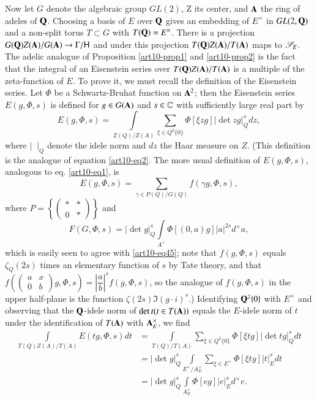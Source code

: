 Now let $G$ denote the algebraic group $GL(2)$, Z its center, and $\mathbf{A}$ the ring of adeles of $\mathbf{Q}$. Choosing a basis of $E$ over $\mathbf{Q}$ gives an embedding of $E^\times$ in $GL (2, \mathbf{Q})$ and a non-split torus $T \subset G$ with $T (\mathbf{Q}) = E^{\times}$. There is a projection $G (\mathbf{Q}) Z(\mathbf{A})/ G (\mathbf{A}) \to \Gamma / \mathsf{H}$ and under this projection $T (\mathbf{Q}) Z (\mathbf{A}) / T (\mathbf{A})$ maps to $\mathscr{S}_E$. The adelic analogue of Proposition \ref{art10-prop1} and \ref{art10-prop2} is the fact that the integral of an Eisenstein series over $T (\mathbf{Q})Z (\mathbf{A}) / T (\mathbf{A})$ is a multiple of the zeta-function of $E$. To prove it, we must recall the definition of the Eisenstein series. Let $\Phi$ be a Schwartz-Bruhat function on $\mathbf{A}^2$; then the Eisenstein series $E (g, \Phi, s)$ is defined for $g \in G(\mathbf{A})$ and $s \in \mathbb{C}$ with sufficiently large real part by 
\begin{equation*}
E (g , \Phi, s) = \int\limits_{Z (Q) / Z (A)} \sum\limits_{\xi \in Q^2 \{0\}} \Phi [\xi z g] |\det z g|^s_Q dz, \tag{45} \label{art10-eq45}
\end{equation*}
where $|{\;\;}|_Q$ denote the idele norm and $dz$ the Haar measure on $Z$. (This definition is the analogue of equation \eqref{art10-eq2}. The more usual definition of $E(g, \Phi, s)$, analogous to eq. \eqref{art10-eq1}, is
$$
E (g, \Phi , s) = \sum\limits_{ \gamma \in P (Q) / G (Q)} f (\gamma g, \Phi , s),
$$
where $P = \left\{\left(\begin{matrix}\ast & \ast \\ 0 & \ast \end{matrix}\right)\right\}$ and 
$$
F (G, \Phi, s) = |\det g|^s_Q \int\limits_{A^\times } \Phi [(0, a)g]|a|^{2s} d^\times a,
$$
which is easily seen to agree with \eqref{art10-eq45}; note that $f(g, \Phi, s)$ equals $\zeta_Q (2s)$ times an elementary function of $s$ by Tate theory, and that $f\left(\left(\begin{matrix} 
a & x \\ 0 & b
\end{matrix}
\right) g, \Phi, s\right) =  \left|\dfrac{a}{b} \right|^s f(g, \Phi, s)$, so the analogue of $f (g, \Phi, s)$ in the upper half-plane is the function $\zeta(2s) \Im (g \cdot i)^s$.)  Identifying $\mathbf{Q}^2 \{0\}$ with $E^\times$ and observing that the $\mathbf{Q}$-idele norm of $\det t (t \in T (\mathbf{A}))$ equals the $E$-idele norm of $t$ under the identification of $T (\mathbf{A})$ with $\mathbf{A}_E^\times$, we find 
\begin{align*}
\int\limits_{T(Q) Z(A)/ T (A)}  E(tg , \Phi, s) dt & =  \int\limits_{T (Q)/ T (A)} \sum\limits_{\xi \in Q^2 \{0\}} \Phi [\xi t g ] |\det tg|^s_Q dt\\
& = |\det g|^s_Q \int\limits_{E^\times / A^\times_E} \sum\limits_{\xi \in E^\times} \Phi [\xi t g] |t|^s_E dt \\
& = |\det g|^s_Q \int\limits_{A^\times_E} \Phi [eg] |e|^s_E d^\times e. 
 \end{align*}

